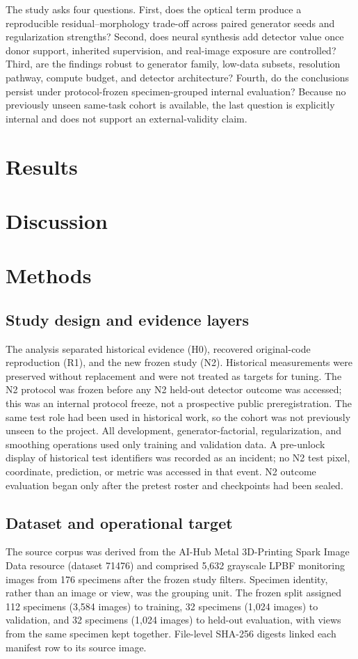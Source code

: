 \documentclass[11pt]{article}
\begin{document}
The study asks four questions. First, does the optical term produce a reproducible residual--morphology trade-off across paired generator seeds and regularization strengths? Second, does neural synthesis add detector value once donor support, inherited supervision, and real-image exposure are controlled? Third, are the findings robust to generator family, low-data subsets, resolution pathway, compute budget, and detector architecture? Fourth, do the conclusions persist under protocol-frozen specimen-grouped internal evaluation? Because no previously unseen same-task cohort is available, the last question is explicitly internal and does not support an external-validity claim.

\section{Results}


\section{Discussion}


\section{Methods}

\subsection{Study design and evidence layers}
The analysis separated historical evidence (H0), recovered original-code reproduction (R1), and the new frozen study (N2). Historical measurements were preserved without replacement and were not treated as targets for tuning. The N2 protocol was frozen before any N2 held-out detector outcome was accessed; this was an internal protocol freeze, not a prospective public preregistration. The same test role had been used in historical work, so the cohort was not previously unseen to the project. All development, generator-factorial, regularization, and smoothing operations used only training and validation data. A pre-unlock display of historical test identifiers was recorded as an incident; no N2 test pixel, coordinate, prediction, or metric was accessed in that event. N2 outcome evaluation began only after the pretest roster and checkpoints had been sealed.

\subsection{Dataset and operational target}
The source corpus was derived from the AI-Hub Metal 3D-Printing Spark Image Data resource (dataset 71476) \citep{aihub71476} and comprised 5,632 grayscale LPBF monitoring images from 176 specimens after the frozen study filters. Specimen identity, rather than an image or view, was the grouping unit. The frozen split assigned 112 specimens (3,584 images) to training, 32 specimens (1,024 images) to validation, and 32 specimens (1,024 images) to held-out evaluation, with views from the same specimen kept together. File-level SHA-256 digests linked each manifest row to its source image.
\end{document}
